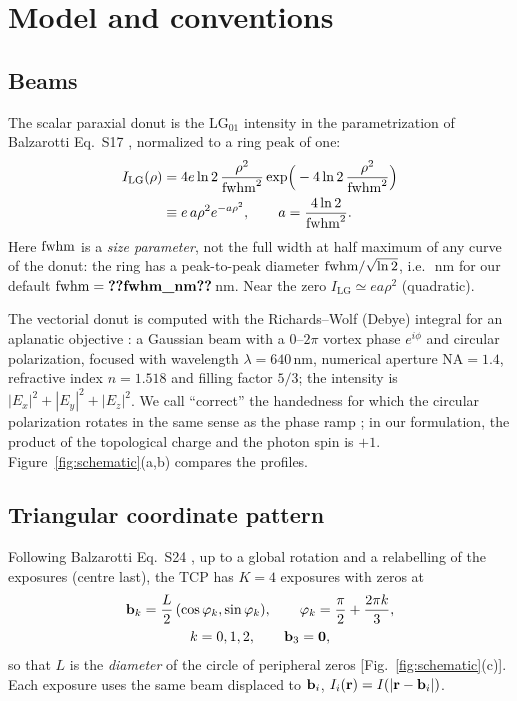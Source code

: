 \section{Model and conventions}\label{sec:model}

\subsection{Beams}
The scalar paraxial donut is the LG$_{01}$ intensity in the parametrization of Balzarotti
Eq.~S17 \cite{Balzarotti2017}, normalized to a ring peak of one:
\begin{equation}
\begin{aligned}
I_{\mathrm{LG}}(\rho)&=4e\ln2\,\frac{\rho^2}{\mathrm{fwhm}^2}\exp\!\Big(-4\ln2\,\frac{\rho^2}{\mathrm{fwhm}^2}\Big)\\
&\equiv e\,a\rho^2e^{-a\rho^2},\qquad a=\frac{4\ln2}{\mathrm{fwhm}^2}.
\end{aligned}
\label{eq:lg}
\end{equation}
Here $\mathrm{fwhm}$ is a \emph{size parameter}, not the full width at half maximum of any curve of the
donut: the ring has a peak-to-peak diameter $\mathrm{fwhm}/\sqrt{\ln2}$, i.e.\
\,nm for our default
$\fwhm=\pnum{fwhm_nm}\src{fwhm_nm}$\,nm. Near the zero $I_{\mathrm{LG}}\simeq ea\rho^2$
(quadratic).

The vectorial donut is computed with the Richards--Wolf (Debye) integral for an aplanatic
objective \cite{Caprile2022}: a Gaussian beam with a $0$--$2\pi$ vortex phase $e^{i\phi}$ and
circular polarization, focused with wavelength $\lambda=640$\,nm, numerical aperture
$\mathrm{NA}=1.4$, refractive index $n=1.518$ and filling factor $5/3$; the intensity is
$|E_x|^2+|E_y|^2+|E_z|^2$. We call ``correct'' the handedness for which the circular polarization
rotates in the same sense as the phase ramp \cite{Lopez2023,Caprile2022}; in our formulation,
the product of the topological charge and the photon spin is $+1$. Figure~\ref{fig:schematic}(a,b)
compares the profiles.

\subsection{Triangular coordinate pattern}
Following Balzarotti Eq.~S24 \cite{Balzarotti2017}, up to a global rotation and a relabelling
of the exposures (centre last), the TCP has $K=4$ exposures with zeros at
\begin{equation}
\begin{gathered}
\mathbf{b}_k=\frac{L}{2}\,(\cos\varphi_k,\sin\varphi_k),\qquad \varphi_k=\frac{\pi}{2}+\frac{2\pi k}{3},\\
k=0,1,2,\qquad \mathbf{b}_3=\mathbf{0},
\end{gathered}
\label{eq:tcp}
\end{equation}
so that $L$ is the \emph{diameter} of the circle of peripheral zeros
[Fig.~\ref{fig:schematic}(c)]. Each exposure uses the same beam displaced to $\mathbf{b}_i$,
$I_i(\mathbf{r})=I(|\mathbf{r}-\mathbf{b}_i|)$.


